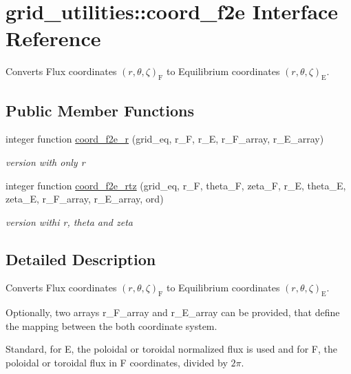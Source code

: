 \hypertarget{interfacegrid__utilities_1_1coord__f2e}{}\section{grid\+\_\+utilities\+:\+:coord\+\_\+f2e Interface Reference}
\label{interfacegrid__utilities_1_1coord__f2e}


Converts Flux coordinates $\left(r,\theta,\zeta\right)_\text{F}$ to Equilibrium coordinates $\left(r,\theta,\zeta\right)_\text{E}$.  


\subsection*{Public Member Functions}
\begin{DoxyCompactItemize}
\item 
integer function \hyperlink{interfacegrid__utilities_1_1coord__f2e_a40c73347672152f144ccaa9cd024267d}{coord\+\_\+f2e\+\_\+r} (grid\+\_\+eq, r\+\_\+F, r\+\_\+E, r\+\_\+\+F\+\_\+array, r\+\_\+\+E\+\_\+array)
\begin{DoxyCompactList}\small\item\em version with only r \end{DoxyCompactList}\item 
integer function \hyperlink{interfacegrid__utilities_1_1coord__f2e_a3ab9822d623e86babe9eb47f99c9434e}{coord\+\_\+f2e\+\_\+rtz} (grid\+\_\+eq, r\+\_\+F, theta\+\_\+F, zeta\+\_\+F, r\+\_\+E, theta\+\_\+E, zeta\+\_\+E, r\+\_\+\+F\+\_\+array, r\+\_\+\+E\+\_\+array, ord)
\begin{DoxyCompactList}\small\item\em version withi r, theta and zeta \end{DoxyCompactList}\end{DoxyCompactItemize}


\subsection{Detailed Description}
Converts Flux coordinates $\left(r,\theta,\zeta\right)_\text{F}$ to Equilibrium coordinates $\left(r,\theta,\zeta\right)_\text{E}$. 

Optionally, two arrays {\ttfamily r\+\_\+\+F\+\_\+array} and {\ttfamily r\+\_\+\+E\+\_\+array} can be provided, that define the mapping between the both coordinate system.

Standard, for E, the poloidal or toroidal normalized flux is used and for F, the poloidal or toroidal flux in F coordinates, divided by $2\pi$.

